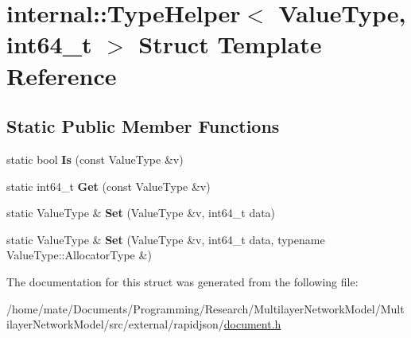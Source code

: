 \hypertarget{structinternal_1_1TypeHelper_3_01ValueType_00_01int64__t_01_4}{}\section{internal\+:\+:Type\+Helper$<$ Value\+Type, int64\+\_\+t $>$ Struct Template Reference}
\label{structinternal_1_1TypeHelper_3_01ValueType_00_01int64__t_01_4}
\subsection*{Static Public Member Functions}
\begin{DoxyCompactItemize}
\item 
static bool {\bfseries Is} (const Value\+Type \&v)\hypertarget{structinternal_1_1TypeHelper_3_01ValueType_00_01int64__t_01_4_a43c171bfbe873941a1b2be698a95de74}{}\label{structinternal_1_1TypeHelper_3_01ValueType_00_01int64__t_01_4_a43c171bfbe873941a1b2be698a95de74}

\item 
static int64\+\_\+t {\bfseries Get} (const Value\+Type \&v)\hypertarget{structinternal_1_1TypeHelper_3_01ValueType_00_01int64__t_01_4_abe3368c8817cafe420a8b3f7d6ec1759}{}\label{structinternal_1_1TypeHelper_3_01ValueType_00_01int64__t_01_4_abe3368c8817cafe420a8b3f7d6ec1759}

\item 
static Value\+Type \& {\bfseries Set} (Value\+Type \&v, int64\+\_\+t data)\hypertarget{structinternal_1_1TypeHelper_3_01ValueType_00_01int64__t_01_4_a0c7b71569c12346902a396111782b12b}{}\label{structinternal_1_1TypeHelper_3_01ValueType_00_01int64__t_01_4_a0c7b71569c12346902a396111782b12b}

\item 
static Value\+Type \& {\bfseries Set} (Value\+Type \&v, int64\+\_\+t data, typename Value\+Type\+::\+Allocator\+Type \&)\hypertarget{structinternal_1_1TypeHelper_3_01ValueType_00_01int64__t_01_4_a85471fa774b4a8f4f56c191694a7f278}{}\label{structinternal_1_1TypeHelper_3_01ValueType_00_01int64__t_01_4_a85471fa774b4a8f4f56c191694a7f278}

\end{DoxyCompactItemize}


The documentation for this struct was generated from the following file\+:\begin{DoxyCompactItemize}
\item 
/home/mate/\+Documents/\+Programming/\+Research/\+Multilayer\+Network\+Model/\+Multilayer\+Network\+Model/src/external/rapidjson/\hyperlink{document_8h}{document.\+h}\end{DoxyCompactItemize}
